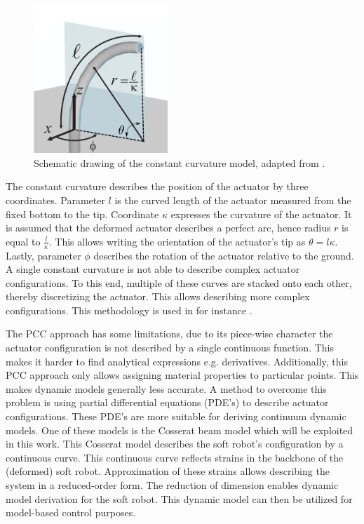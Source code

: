 \begin{figure}[H]
    \centering
    \includegraphics[width = 0.45\textwidth]{Figures/Chapter1/ccapproach2.png}
    \caption{Schematic drawing of the constant curvature model, adapted from \cite{ccapproach}.}
    \label{fig2:ccapproach}
\end{figure}


The constant curvature describes the position of the actuator by three coordinates. Parameter $l$ is the curved length of the actuator measured from the fixed bottom to the tip. Coordinate $\kappa$ expresses the curvature of the actuator. It is assumed that the deformed actuator describes a perfect arc, hence radius $r$ is equal to $\frac{l}{\kappa}$. This allows writing the orientation of the actuator's tip as $\theta = l\kappa$. Lastly, parameter $\phi$ describes the rotation of the actuator relative to the ground. A single constant curvature is not able to describe complex actuator configurations. To this end, multiple of these curves are stacked onto each other, thereby discretizing the actuator. This allows describing more complex configurations. This methodology is used in for instance \cite{Falkenhahn2015}.




The PCC approach has some limitations, due to its piece-wise character the actuator configuration is not described by a single continuous function. This makes it harder to find analytical expressions e.g. derivatives. Additionally, this PCC approach only allows assigning material properties to particular points. This makes dynamic models generally less accurate. A method to overcome this problem is using partial differential equations (PDE's) to describe actuator configurations. These PDE's are more suitable for deriving continuum dynamic models. One of these models is the Cosserat beam model which will be exploited in this work. This Cosserat model describes the soft robot's configuration by a continuous curve. This continuous curve reflects strains in the backbone of the (deformed) soft robot. Approximation of these strains allows describing the system in a reduced-order form. The reduction of dimension enables dynamic model derivation for the soft robot. This dynamic model can then be utilized for model-based control purposes.


